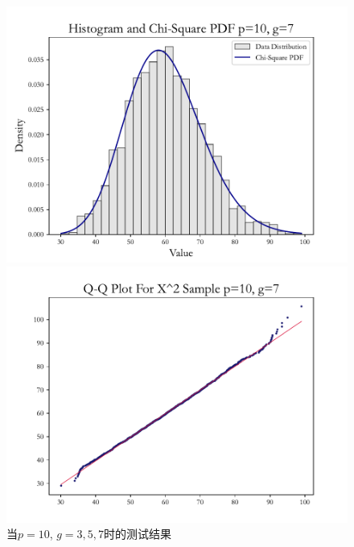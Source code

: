 \documentclass{article} %
\begin{document}
\begin{figure}[H]
\begin{minipage}[b]{0.49\textwidth}
        \includegraphics[width=\textwidth]{img/b/hist_plot_p=10_g=7.pdf}
    \end{minipage}
    \hfill
    \begin{minipage}[b]{0.49\textwidth}
        \centering
        \includegraphics[width=\textwidth]{img/b/qq_plot_p=10_g=7.pdf}
    \end{minipage}

    \caption{当\(p=10\), \(g=3,5,7\)时的测试结果}
    \label{fig:collection2}
\end{figure}
\end{document}
